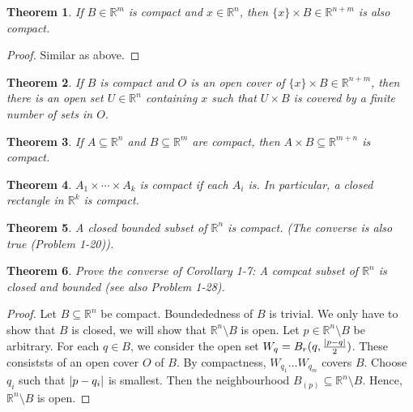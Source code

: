 \documentclass[12pt]{book}
\newtheorem{theorem}{Theorem}
\begin{document}
\begin{theorem}
If $B \in \mathbb{R}^{m}$ is compact and $x \in \mathbb{R}^n$, then $\{x\}\times
B \in \mathbb{R}^{n+m}$ is also compact.
\end{theorem}

\begin{proof}
  Similar as above. 
\end{proof}

\begin{theorem}
If $B$ is compact and $O$ is an open cover of $\{x\}\times B \in
\mathbb{R}^{n+m}$, then there is an open set $U\in \mathbb{R}^n$ containing $x$
such that $U \times B$ is covered by a finite number of sets in $O$.
\end{theorem}

\begin{theorem}
  If $A \subseteq \mathbb{R}^n$  and $B \subseteq \mathbb{R}^m$  are compact, then $A \times B \subseteq \mathbb{R}^{m+n}$ is compact. 
\end{theorem}

\begin{theorem}
  $A_1 \times \cdots \times A_k$ is compact if each $A_i$ is. In particular, a closed rectangle in $\mathbb{R}^k$ is compact. 
\end{theorem}

\begin{theorem}
  A closed bounded subset of $\mathbb{R}^n$ is compact. (The converse is also true (Problem 1-20)).
\end{theorem}

\begin{theorem}
  Prove the converse of Corollary 1-7: A compcat subset of $\mathbb{R}^n$ is closed and bounded (see also Problem 1-28). 
\end{theorem}

\begin{proof}
  Let $B \subseteq \mathbb{R}^n$ be compact. Boundededness of $B$ is trivial. We only have to show that $B$ is closed, we will show that $\mathbb{R}^n \setminus B$ is open. Let $p \in \mathbb{R}^n \setminus B$ be arbitrary. For each $q \in B$, we consider the open set $W_q = B_r(q, \frac{\abs{p-q}}{2})$. These consiststs of an open cover $O$ of $B$. By compactness, $W_{q_1}\ldots W_{q_m}$  covers $B$. Choose $q_i$ such that $\abs{p-q_i}$ is smallest. Then the neighbourhood $B_(p) \subseteq \mathbb{R}^n \setminus B$. Hence, $\mathbb{R}^n\setminus B$ is open. 
\end{proof}
\end{document}
